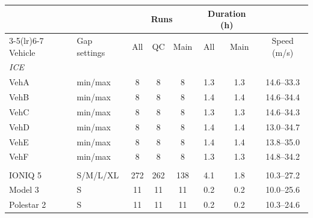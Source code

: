 \begin{tabular}{llcccccc}
\toprule
 & & \multicolumn{3}{c}{Runs} & \multicolumn{2}{c}{Duration (h)} & \\
\cmidrule(lr){3-5}\cmidrule(lr){6-7}
Vehicle & Gap settings & All & QC & Main & All & Main & Speed (m/s) \\
\midrule
\multicolumn{8}{l}{\textit{ICE}} \\
\quad VehA & min/max & 8 & 8 & 8 & 1.3 & 1.3 & 14.6--33.3 \\
\quad VehB & min/max & 8 & 8 & 8 & 1.4 & 1.4 & 14.6--34.4 \\
\quad VehC & min/max & 8 & 8 & 8 & 1.3 & 1.3 & 14.6--34.3 \\
\quad VehD & min/max & 8 & 8 & 8 & 1.4 & 1.4 & 13.0--34.7 \\
\quad VehE & min/max & 8 & 8 & 8 & 1.4 & 1.4 & 13.8--35.0 \\
\quad VehF & min/max & 8 & 8 & 8 & 1.3 & 1.3 & 14.8--34.2 \\
\addlinespace
\multicolumn{8}{l}{\textit{EV}} \\
\quad IONIQ 5 & S/M/L/XL & 272 & 262 & 138 & 4.1 & 1.8 & 10.3--27.2 \\
\quad Model 3 & S & 11 & 11 & 11 & 0.2 & 0.2 & 10.0--25.6 \\
\quad Polestar 2 & S & 11 & 11 & 11 & 0.2 & 0.2 & 10.3--24.6 \\
\bottomrule
\end{tabular}
